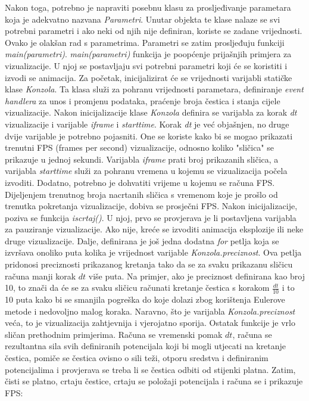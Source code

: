 \documentclass{foi}
\begin{document}
Nakon toga, potrebno je napraviti posebnu klasu za prosljeđivanje parametara koja je adekvatno nazvana \textit{Parametri}. Unutar objekta te klase nalaze se svi potrebni parametri i ako neki od njih nije definiran, koriste se zadane vrijednosti. Ovako je olakšan rad s parametrima. Parametri se zatim prosljeđuju funkciji \textit{main(parametri)}. \textit{main(parametri)} funkcija je poopćenje prijašnjih primjera za vizualizacije. U njoj se postavljaju svi potrebni parametri koji će se koristiti i izvodi se animacija. Za početak, inicijalizirat će se vrijednosti varijabli statičke klase \textit{Konzola}. Ta klasa služi za pohranu vrijednosti parametara, definiranje \textit{event handlera} za unos i promjenu podataka, praćenje broja čestica i stanja cijele vizualizacije. Nakon inicijalizacije klase \textit{Konzola} definira se varijabla za korak \textit{dt} vizualizacije i varijable \textit{iframe} i \textit{starttime}. Korak \textit{dt} je već objašnjen, no druge dvije varijable je potrebno pojasniti. One se koriste kako bi se mogao prikazati trenutni FPS (frames per second) vizualizacije, odnosno koliko "sličica" se prikazuje u jednoj sekundi. Varijabla \textit{iframe} prati broj prikazanih sličica, a varijabla \textit{starttime} služi za pohranu vremena u kojemu se vizualizacija počela izvoditi. Dodatno, potrebno je dohvatiti vrijeme u kojemu se računa FPS. Dijeljenjem trenutnog broja nacrtanih sličica s vremenom koje je prošlo od trenutka pokretanja vizualizacije, dobiva se prosječni FPS. Nakon inicijalizacije, poziva se funkcija \textit{iscrtaj()}. U njoj, prvo se provjerava je li postavljena varijabla za pauziranje vizualizacije. Ako nije, kreće se izvoditi animacija eksplozije ili neke druge vizualizacije. Dalje, definirana je još jedna dodatna \textit{for} petlja koja se izvršava onoliko puta kolika je vrijednost varijable \textit{Konzola.preciznost}. Ova petlja pridonosi preciznosti prikazanog kretanja tako da se za svaku prikazanu sličicu računa manji korak $dt$ više puta. Na primjer, ako je preciznost definirana kao broj 10, to znači da će se za svaku sličicu računati kretanje čestica s korakom $\frac{dt}{10}$ i to 10 puta kako bi se smanjila pogreška do koje dolazi zbog korištenja Eulerove metode i nedovoljno malog koraka. Naravno, što je varijabla \textit{Konzola.preciznost} veća, to je vizualizacija zahtjevnija i vjerojatno sporija. Ostatak funkcije je vrlo sličan prethodnim primjerima. Računa se vremenski pomak $dt$, računa se rezultantna sila svih definiranih potencijala koji bi mogli utjecati na kretanje čestica, pomiče se čestica ovisno o sili teži, otporu sredstva i definiranim potencijalima i provjerava se treba li se čestica odbiti od stijenki platna. Zatim, čisti se platno, crtaju čestice, crtaju se položaji potencijala i računa se i prikazuje FPS:
\end{document}

